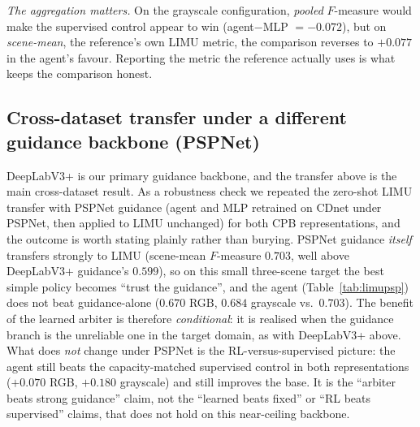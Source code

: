 \documentclass[sn-basic]{sn-jnl}
\newcommand{\Fm}{$F$-measure}
\begin{document}
\emph{The aggregation matters.} On the grayscale configuration, \emph{pooled} \Fm{} would
make the supervised control appear to win (agent$-$MLP $=-0.072$), but on
\emph{scene-mean}, the reference's own LIMU metric, the comparison reverses to
$+0.077$ in the agent's favour. Reporting the metric the reference actually uses is what
keeps the comparison honest.

\subsection{Cross-dataset transfer under a different guidance backbone (PSPNet)}
\label{sec:transfer-pspnet}
DeepLabV3+ is our primary guidance backbone, and the transfer above is the main
cross-dataset result. As a robustness check we repeated the zero-shot LIMU transfer with
PSPNet guidance (agent and MLP retrained on CDnet under PSPNet, then applied to LIMU
unchanged) for both CPB representations, and the outcome is worth stating plainly rather
than burying. PSPNet guidance \emph{itself} transfers strongly to LIMU (scene-mean \Fm{}
$0.703$, well above DeepLabV3+ guidance's $0.599$), so on this small three-scene target
the best simple policy becomes ``trust the guidance'', and the agent
(Table~\ref{tab:limupsp}) does not beat guidance-alone ($0.670$ RGB, $0.684$ grayscale
vs.\ $0.703$). The benefit of the learned arbiter is therefore \emph{conditional}: it is
realised when the guidance branch is the unreliable one in the target domain, as with
DeepLabV3+ above. What does \emph{not} change under PSPNet is the RL-versus-supervised
picture: the agent still beats the capacity-matched supervised control in both
representations ($+0.070$ RGB, $+0.180$ grayscale) and still improves the base. It is the
``arbiter beats strong guidance'' claim, not the ``learned beats fixed'' or ``RL beats
supervised'' claims, that does not hold on this near-ceiling backbone.
\end{document}
